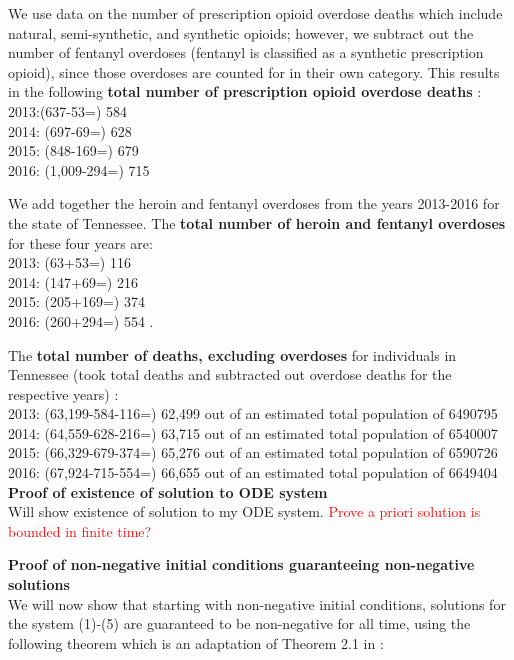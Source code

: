 \documentclass[12pt]{article}
\begin{document}
We use data on the number of prescription opioid overdose deaths which include natural, semi-synthetic, and synthetic opioids; however, we subtract out the number of fentanyl overdoses (fentanyl is classified as a synthetic prescription opioid), since those overdoses are counted for in their own category. This results in the following  \textbf{total number of prescription opioid overdose deaths} \cite{PDO}: \\
2013:(637-53=) 584 \\
2014: (697-69=) 628 \\
2015: (848-169=) 679 \\
2016: (1,009-294=) 715  

We add together the heroin and fentanyl overdoses from the years 2013-2016 for the state of Tennessee. The \textbf{total number of heroin and fentanyl overdoses} for these four years are: \\
2013: (63+53=) 116 \\
2014: (147+69=) 216 \\
2015: (205+169=) 374 \\
2016: (260+294=) 554 \cite{PDO}. 


The \textbf{total number of deaths, excluding overdoses} for individuals in Tennessee (took total deaths and subtracted out overdose deaths for the respective years) \cite{TNgov2, USCensus}: \\
2013: (63,199-584-116=) 62,499 out of an estimated total population of 6490795 \\
2014: (64,559-628-216=) 63,715 out of an estimated total population of 6540007 \\
2015: (66,329-679-374=) 65,276 out of an estimated total population of 6590726 \\
2016: (67,924-715-554=) 66,655 out of an estimated total population of 6649404 \\



 \textbf{Proof of existence of solution to ODE system} \\
Will show existence of solution to my ODE system. \textcolor{red}{Prove a priori solution is bounded in finite time?}


\textbf{Proof of non-negative initial conditions guaranteeing non-negative solutions} \\
We will now show that starting with non-negative initial conditions, solutions for the system (1)-(5) are guaranteed to be non-negative for all time, using the following theorem which is an adaptation of Theorem 2.1 in \cite{Smith}: 
 
\end{document}
